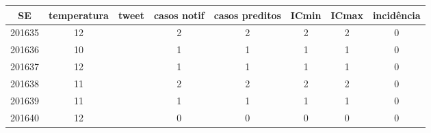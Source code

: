 \begin{tabular}{c|ccccccc}
  \hline
SE & temperatura & tweet & casos notif & casos preditos & ICmin & ICmax & incidência \\ 
  \hline
201635 & 12 &  & 2 & 2 & 2 & 2 & 0 \\ 
  201636 & 10 &  & 1 & 1 & 1 & 1 & 0 \\ 
  201637 & 12 &  & 1 & 1 & 1 & 1 & 0 \\ 
  201638 & 11 &  & 2 & 2 & 2 & 2 & 0 \\ 
  201639 & 11 &  & 1 & 1 & 1 & 1 & 0 \\ 
  201640 & 12 &  & 0 & 0 & 0 & 0 & 0 \\ 
   \hline
\end{tabular}
